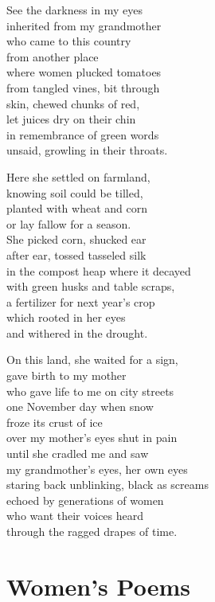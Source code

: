 \documentclass[twoside,10pt]{book}
\begin{document}
See the darkness in my eyes\\
inherited from my grandmother\\
who came to this country\\
from another place\\
where women plucked tomatoes\\
from tangled vines, bit through\\
skin, chewed chunks of red,\\
let juices dry on their chin\\
in remembrance of green words\\
unsaid, growling in their throats.

Here she settled on farmland,\\
knowing soil could be tilled,\\
planted with wheat and corn\\
or lay fallow for a season.\\
She picked corn, shucked ear\\
after ear, tossed tasseled silk\\
in the compost heap where it decayed\\
with green husks and table scraps,\\
a fertilizer for next year's crop\\
which rooted in her eyes\\
and withered in the drought.

On this land, she waited for a sign,\\
gave birth to my mother\\
who gave life to me on city streets\\
one November day when snow\\
froze its crust of ice\\
over my mother's eyes shut in pain\\
until she cradled me and saw\\
my grandmother's eyes, her own eyes\\
staring back unblinking, black as screams\\
echoed by generations of women\\
who want their voices heard\\
through the ragged drapes of time.


\clearpage
\section{Women's Poems}
\end{document}

